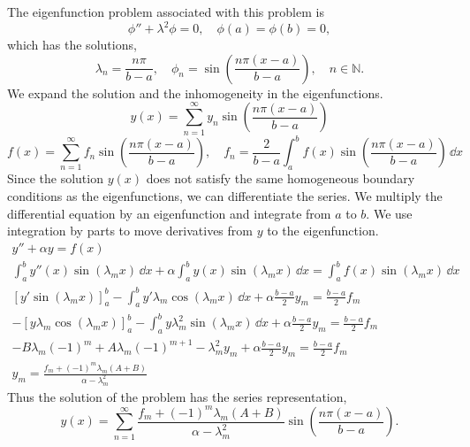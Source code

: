{%
\begin{Solution}
  The eigenfunction problem associated with this problem is
  \[
  \phi'' + \lambda^2 \phi = 0, \quad \phi(a) = \phi(b) = 0,
  \]
  which has the solutions,
  \[
  \lambda_n = \frac{n \pi}{b-a}, \quad
  \phi_n = \sin \left( \frac{ n \pi (x-a) }{ b-a } \right), \quad
  n \in \mathbb{N}.
  \]
  We expand the solution and the inhomogeneity in the eigenfunctions.
  \[
  y(x) = \sum_{n = 1}^\infty y_n \sin \left( \frac{ n \pi (x-a) }{ b-a } \right)
  \]
  \[
  f(x) = \sum_{n = 1}^\infty f_n \sin \left( \frac{ n \pi (x-a) }{ b-a } \right), \quad
  f_n = \frac{2}{b-a} \int_a^b f(x) \sin \left( \frac{ n \pi (x-a) }{ b-a }
  \right) \,\dd x
  \]
  Since the solution $y(x)$ does not satisfy the same homogeneous boundary 
  conditions as the eigenfunctions, we can differentiate the series.  
  We multiply the differential equation by an eigenfunction and integrate
  from $a$ to $b$.  We use integration by parts to move derivatives 
  from $y$ to the eigenfunction.
  \begin{gather*}
    y'' + \alpha y = f(x) \\
    \int_a^b y''(x) \sin( \lambda_m x)\,\dd x 
    + \alpha \int_a^b y(x) \sin( \lambda_m x)\,\dd x 
    = \int_a^b f(x) \sin( \lambda_m x)\,\dd x \\
    \left[ y' \sin( \lambda_m x) \right]_a^b
    - \int_a^b y' \lambda_m \cos( \lambda_m x)\,\dd x 
    + \alpha \frac{b-a}{2} y_m
    = \frac{b-a}{2} f_m \\
    - \left[ y \lambda_m \cos( \lambda_m x ) \right]_a^b
    - \int_a^b y \lambda_m^2 \sin( \lambda_m x)\,\dd x 
    + \alpha \frac{b-a}{2} y_m
    = \frac{b-a}{2} f_m \\
    - B \lambda_m (-1)^m + A \lambda_m (-1)^{m+1}
    - \lambda_m^2 y_m
    + \alpha \frac{b-a}{2} y_m
    = \frac{b-a}{2} f_m \\
    y_m = \frac{ f_m + (-1)^m \lambda_m (A+B) }{\alpha - \lambda_m^2} 
  \end{gather*}
  Thus the solution of the problem has the series representation,
  \[
  \boxed{
    y(x) = \sum_{n = 1}^\infty 
    \frac{ f_m + (-1)^m \lambda_m (A+B) }{\alpha - \lambda_m^2} 
    \sin \left( \frac{ n \pi (x-a) }{ b-a } \right).
    }
  \]
\end{Solution}










}

